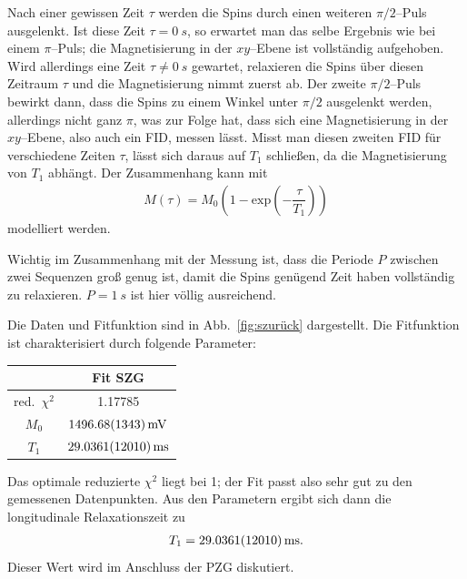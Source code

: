 \documentclass[10pt]{article}
\newenvironment{Figure}
  {\par\medskip\noindent\minipage{\linewidth}}
  {\endminipage\par\medskip}
\begin{document}
\begin{multicols}{2}
Nach einer gewissen Zeit $\tau $ werden die Spins durch einen weiteren $\pi /2$--Puls ausgelenkt. 
Ist diese Zeit $\tau =\SI{0}{s}$, so erwartet man das selbe Ergebnis wie bei einem $\pi $--Puls; die Magnetisierung in der $xy$--Ebene ist vollständig aufgehoben.
Wird allerdings eine Zeit $\tau \neq \SI{0}{s}$ gewartet, relaxieren die Spins über diesen Zeitraum $\tau $ und die Magnetisierung nimmt zuerst ab.
Der zweite $\pi /2$--Puls bewirkt dann, dass die Spins zu einem Winkel unter $\pi /2$ ausgelenkt werden, allerdings nicht ganz $\pi $, was zur Folge hat, dass sich eine Magnetisierung in der $xy$--Ebene, also auch ein FID, messen lässt.
Misst man diesen zweiten FID für verschiedene Zeiten $\tau $, lässt sich daraus auf $T_1$ schließen, da die Magnetisierung von $T_1$ abhängt.
Der Zusammenhang kann mit
\begin{align} 
        M\left(\tau \right)=M_0\left(1-\text{exp}\left(-\dfrac{\tau }{T_1}\right)\right)
\end{align} 
modelliert werden.

Wichtig im Zusammenhang mit der Messung ist, dass die Periode $P$ zwischen zwei Sequenzen groß genug ist, damit die Spins genügend Zeit haben vollständig zu relaxieren.
$P=\SI{1}{s}$ ist hier völlig ausreichend.
  \begin{Figure}
    \centering\resizebox{\textwidth}{!}{}
    \label{fig:szurück}
  \end{Figure}
Die Daten und Fitfunktion sind in Abb.\ \ref{fig:szurück} dargestellt.
Die Fitfunktion ist charakterisiert durch folgende Parameter:
  \begin{center}
    \begin{tabular}{c|c}
    & Fit SZG\\
    \hline
    red.\ $\chi^2$ & 1.17785\\
    $M_0$ & $\SI{1496.68+-13.43}{mV}$ \\
    $T_1$ & $\SI{29.0361+-1.201}{ms}$ 
    \end{tabular}
  \label{Tab:SZG_para}
  \end{center}
Das optimale reduzierte $\chi ^2$ liegt bei 1; der Fit passt also sehr gut zu den gemessenen Datenpunkten.
Aus den Parametern ergibt sich dann die longitudinale Relaxationszeit zu
\begin{align} 
        T_1=\SI{29.0361+-1.201}{ms}
.\end{align} 
Dieser Wert wird im Anschluss der PZG diskutiert.


\end{multicols}
\end{document}
